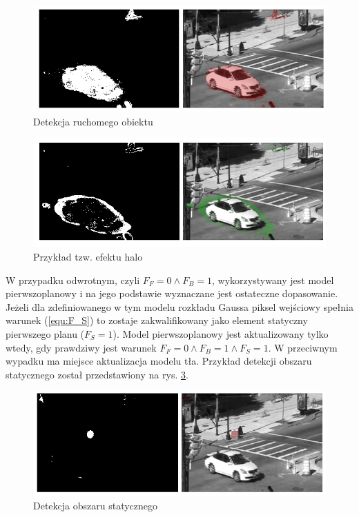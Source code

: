 \documentclass[10pt,a4paper]{article}
\begin{document}
		\begin{figure}[h]
				\centering
				\includegraphics[scale=0.65]{img/ftsg_moving_obj.png}
				\caption{Detekcja ruchomego obiektu}
				\label{fig:ftsg_moving_obj}
		\end{figure}
		
		\begin{figure}[h]
				\centering
				\includegraphics[scale=0.65]{img/ftsg_halo.png}
				\caption{Przykład tzw. efektu halo}
				\label{fig:ftsg_halo}
		\end{figure}

W przypadku odwrotnym, czyli $F_F = 0 \land F_B = 1$, wykorzystywany jest model pierwszoplanowy i na jego podstawie wyznaczane jest ostateczne dopasowanie. Jeżeli dla zdefiniowanego w tym modelu rozkładu Gaussa piksel wejściowy spełnia warunek (\ref{equ:F_S}) to zostaje zakwalifikowany jako element statyczny pierwszego planu ($F_S = 1$). Model pierwszoplanowy jest aktualizowany tylko wtedy, gdy prawdziwy jest warunek $F_F = 0 \land F_B = 1 \land F_S = 1$. W przeciwnym wypadku ma miejsce aktualizacja modelu tła. Przykład detekcji obszaru statycznego został przedstawiony na rys. \ref{fig:ftsg_static}.

		\begin{figure}[h]
				\centering
				\includegraphics[scale=0.65]{img/ftsg_static_obj.png}
				\caption{Detekcja obszaru statycznego}
				\label{fig:ftsg_static}
		\end{figure}
\end{document}
